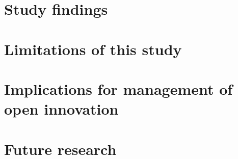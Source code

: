 

\section{Study findings}

\section{Limitations of this study}

\section{Implications for management of open innovation}

\section{Future research}

